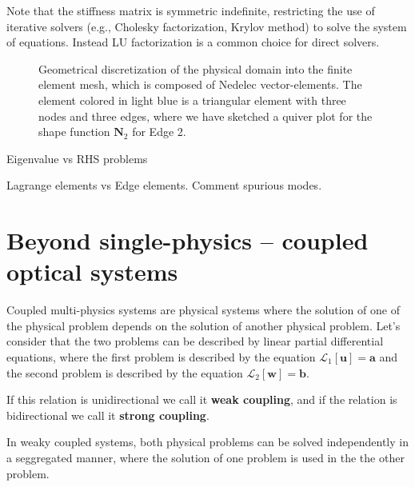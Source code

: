 Note that the stiffness matrix is symmetric indefinite, restricting the use of iterative solvers (e.g., Cholesky factorization, Krylov method) to solve the system of equations. Instead LU factorization is a common choice for direct solvers.
\begin{figure}[tb]
    \centering
    \caption{Geometrical discretization of the physical domain into the finite element mesh, which is composed of Nedelec vector-elements. The element colored in light blue is a triangular element with three nodes and three edges, where we have sketched a quiver plot for the shape function $\mathbf{N}_2$ for Edge 2.}
    \label{fig:fem}
\end{figure}

Eigenvalue vs RHS problems


Lagrange elements vs Edge elements. Comment spurious modes.

\section{Beyond single-physics -- coupled optical systems}

Coupled multi-physics systems are physical systems where the solution of one of the physical 
problem depends on the solution of another physical problem. Let's consider that the two
problems can be described by linear partial differential equations, where the first problem
is described by the equation $\mathcal{L}_1 [\mathbf{u}]= \mathbf{a}$ and the second problem is described by the 
equation $\mathcal{L}_2 [\mathbf{w}]= \mathbf{b}$.

 If this relation is unidirectional
we call it \textbf{weak coupling}, and if the relation is bidirectional we call it 
\textbf{strong coupling}.

In weaky coupled systems, both physical problems can be solved independently in a seggregated 
manner, where the solution of one problem is used in the the other problem.

